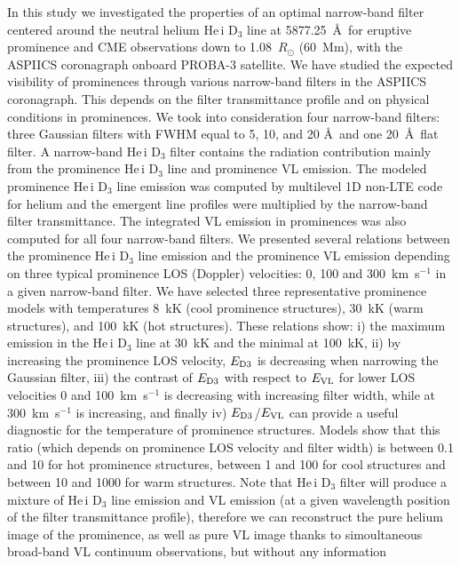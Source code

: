 \documentclass[namedreferences]{solarphysics}
\begin{document}
\begin{article}
In this study we investigated the properties of an optimal narrow-band filter centered around the neutral helium He\,{\sc i} D$_{3}$ line at 5877.25~\AA~for 
eruptive prominence and CME observations down to 1.08~$R_{\odot}$ (60~Mm), with the ASPIICS coronagraph onboard PROBA-3 satellite. 
We have studied the expected visibility of prominences through various narrow-band filters in the ASPIICS coronagraph. This depends on the filter 
transmittance profile and on physical conditions in prominences. 
We took into consideration four narrow-band filters: three Gaussian filters with FWHM equal to 5, 10, and 20 \AA~and one 20~\AA~flat filter. 
A narrow-band He\,{\sc i} D$_{3}$ filter contains the radiation contribution mainly from the prominence He\,{\sc i} D$_{3}$ 
line and prominence VL emission. The modeled prominence He\,{\sc i} D$_{3}$ line emission was computed by multilevel 
1D non-LTE code for helium and the emergent line profiles were multiplied by the narrow-band filter transmittance. 
The integrated VL emission in prominences was also computed for all four narrow-band filters.  
We presented several relations between the prominence He\,{\sc i} D$_{3}$ line emission and the prominence VL emission depending on three typical 
prominence  LOS (Doppler) velocities: 0, 100 and 300~km~s$^{-1}$ in a given narrow-band filter. 
We have selected three representative prominence models with temperatures 8~kK 
(cool prominence structures), 30~kK (warm structures), and 100~kK (hot structures). 
These relations show: i) the maximum emission in the He\,{\sc i} D$_3$ line at 30~kK and the minimal at 100~kK, 
ii) by increasing the prominence LOS velocity, $E_{\rm D3}$ is decreasing when narrowing the Gaussian filter, 
iii) the contrast of $E_{\rm D3}$ with respect to $E_{\rm VL}$ for lower LOS velocities 0 and 100~km~s$^{-1}$ is decreasing with increasing filter width, while at 300~km~s$^{-1}$ is increasing, and finally
iv) $E_{\rm D3}$/$E_{\rm VL}$ can provide a useful diagnostic for the temperature of prominence structures. Models show that this ratio (which depends on prominence LOS velocity and filter width)
is between 0.1 and 10 for hot prominence structures, 
between 1 and 100 for cool structures and between 10 and 1000 for warm structures.
Note that He\,{\sc i} D$_{3}$ filter will produce a mixture of 
He\,{\sc i} D$_{3}$ line emission and VL emission (at a given wavelength position of the filter transmittance profile), therefore we can reconstruct the 
pure helium image of the prominence, as well as pure VL image thanks to simoultaneous broad-band VL continuum observations, but without any information 

\end{article}
\end{document}
